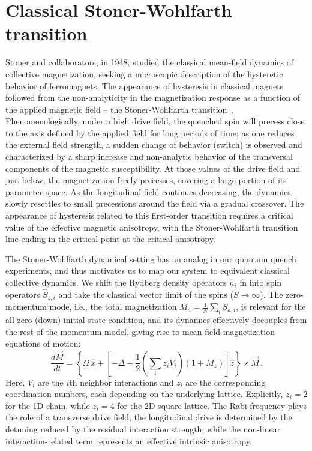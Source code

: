 \documentclass[english,floatfix,twocolumn,showpacs, aps, prx, reprint, superscriptaddress, longbibliography]{revtex4-2}
\begin{document}
\section{Classical Stoner-Wohlfarth transition}
\label{supp:sec:classical_spin_models}

Stoner and collaborators, in 1948, studied the classical mean-field dynamics of collective magnetization, seeking a microscopic description of the hysteretic behavior of ferromagnets. The appearance of hysteresis in classical magnets followed from the non-analyticity in the magnetization response as a function of the applied magnetic field -- the Stoner-Wohlfarth transition~\cite{Stoner:1948}. Phenomenologically, under a high drive field, the quenched spin will precess close to the axis defined by the applied field for long periods of time; as one reduces the external field strength, a sudden change of behavior (switch) is observed and characterized by a sharp increase and non-analytic behavior of the transversal components of the magnetic susceptibility. At those values of the drive field and just below, the magnetization freely precesses, covering a large portion of its parameter space. As the longitudinal field continues decreasing, the dynamics slowly resettles to small precessions around the field via a gradual crossover. The appearance of hysteresis related to this first-order transition requires a critical value of the effective magnetic anisotropy, with the Stoner-Wohlfarth transition line ending in the critical point at the critical anisotropy.

The Stoner-Wohlfarth dynamical setting has an analog in our quantum quench experiments, and thus motivates us to map our system to equivalent classical collective dynamics. We shift the Rydberg density operators $\hat{n}_i$ in  into spin operators $\hat{S}_{z,i}$ and take the classical vector limit of the spins ($S \rightarrow \infty$). The zero-momentum mode, i.e., the total magnetization $M_a = \frac{1}{N}\sum_i S_{a,i}$, is relevant for the all-zero (down) initial state condition, and its dynamics effectively decouples from the rest of the momentum model, giving rise to mean-field magnetization equations of motion:
\begin{equation}
\frac{d\vec{M}}{dt} = \left\lbrace \Omega \, \hat{x} + \left[-\Delta + \frac{1}{2} \left( \sum_{i} z_i V_i \right) (1 + M_z) \right] \hat{z} \right\rbrace \times \vec{M} \, . 
\label{eq:classical_eom}
\end{equation}
Here, $V_i$ are the $i$th neighbor interactions and $z_i$ are the corresponding coordination numbers, each depending on the underlying lattice. Explicitly, $z_i = 2$ for the 1D chain, while $z_i = 4$ for the 2D square lattice. The Rabi frequency plays the role of a transverse drive field; the longitudinal drive is determined by the detuning reduced by the residual interaction strength, while the non-linear interaction-related term represents an effective intrinsic anisotropy.
\end{document}
